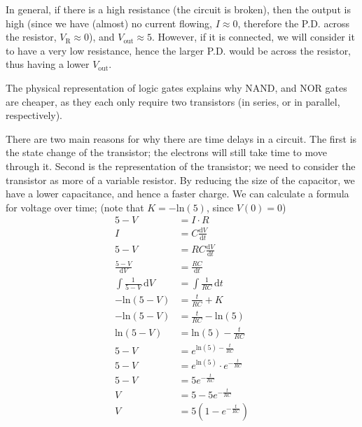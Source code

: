 \documentclass[a4paper, 12pt]{article}
\newcommand{\indefint}[2]{\int #1 \, \mathrm{d}#2}
\newcommand{\dif}[2]{\frac{\mathrm{d}#1}{\mathrm{d}#2}}
\begin{document}
            In general, if there is a high resistance (the circuit is broken), then the output is high (since we have (almost) no current flowing, $I \approx 0$, therefore the P.D. across the resistor, $V_\text{R} \approx 0$), and $V_\text{out} \approx 5$. However, if it is connected, we will consider it to have a very low resistance, hence the larger P.D. would be across the resistor, thus having a lower $V_\text{out}$.
            \medskip

            The physical representation of logic gates explains why NAND, and NOR gates are cheaper, as they each only require two transistors (in series, or in parallel, respectively).
            \medskip

            There are two main reasons for why there are time delays in a circuit. The first is the state change of the transistor; the electrons will still take time to move through it. Second is the representation of the transistor; we need to consider the transistor as more of a variable resistor. By reducing the size of the capacitor, we have a lower capacitance, and hence a faster charge. We can calculate a formula for voltage over time; (note that $K = -\mathrm{ln}(5)$, since $V(0) = 0$)
            \begin{align*}
                5 - V & = I \cdot R \\
                I & = C \dif{V}{t} \\
                5 - V & = RC \dif{V}{t} \\
                \frac{5 - V}{\mathrm{d}V} & = \frac{RC}{\mathrm{d}t} \\
                \indefint{\frac{1}{5 - V}}{V} & = \indefint{\frac{1}{RC}}{t} \\
                -\mathrm{ln}(5 - V) & = \frac{t}{RC} + K \\
                -\mathrm{ln}(5 - V) & = \frac{t}{RC} - \mathrm{ln}(5) \\
                \mathrm{ln}(5 - V) & = \mathrm{ln}(5) - \frac{t}{RC} \\
                5 - V & = e^{\mathrm{ln}(5) - \frac{t}{RC}} \\
                5 - V & = e^{\mathrm{ln}(5)} \cdot e^{-\frac{t}{RC}} \\
                5 - V & = 5e^{-\frac{t}{RC}} \\
                V & = 5 - 5e^{-\frac{t}{RC}} \\
                V & = 5(1 - e^{-\frac{t}{RC}})
            \end{align*}
\end{document}
